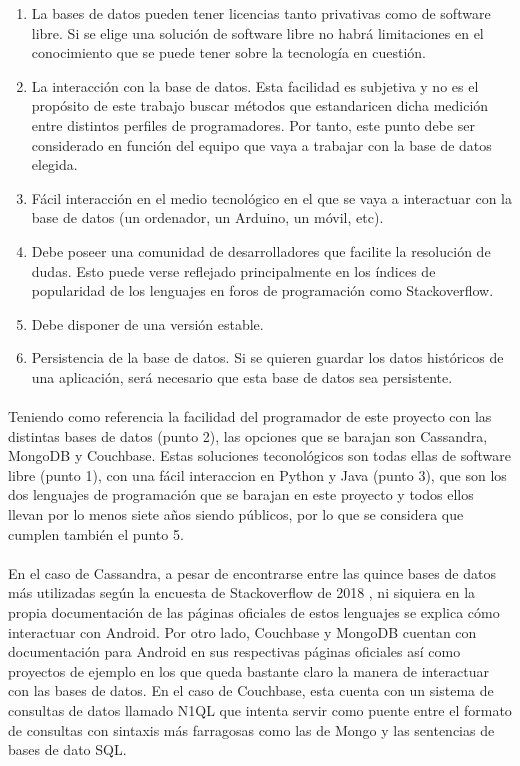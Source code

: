 \begin{itemize}
\begin{enumerate}
\item La bases de datos pueden tener licencias tanto privativas como de software libre. Si se elige una solución de software libre no habrá limitaciones en el conocimiento que se puede tener sobre la tecnología en cuestión.
\item La interacción con la base de datos. Esta facilidad es subjetiva y no es el propósito de este trabajo buscar métodos que estandaricen dicha medición entre distintos perfiles de programadores. Por tanto, este punto debe ser considerado en función del equipo que vaya a trabajar con la base de datos elegida.
\item Fácil interacción en el medio tecnológico en el que se vaya a interactuar con la base de datos (un ordenador, un Arduino, un móvil, etc).
\item Debe poseer una comunidad de desarrolladores que facilite la resolución de dudas. Esto puede verse reflejado principalmente en los índices de popularidad de los lenguajes en foros de programación como Stackoverflow.
\item Debe disponer de una versión estable.
\item Persistencia de la base de datos. Si se quieren guardar los datos históricos de una aplicación, será necesario que esta base de datos sea persistente.
\end{enumerate}

\paragraph{}
Teniendo como referencia la facilidad del programador de este proyecto con las distintas bases de datos (punto 2), las opciones que se barajan son Cassandra, MongoDB y Couchbase. Estas soluciones teconológicos son todas ellas de software libre (punto 1), con una fácil interaccion en Python y Java (punto 3), que son los dos lenguajes de programación que se barajan en este proyecto y todos ellos llevan por lo menos siete años siendo públicos, por lo que se considera que cumplen también el punto 5.

\paragraph{}
En el caso de Cassandra, a pesar de encontrarse entre las quince bases de datos más utilizadas según la encuesta de Stackoverflow de 2018 \citep{so-db}, ni siquiera en la propia documentación de las páginas oficiales de estos lenguajes se explica cómo interactuar con Android. Por otro lado, Couchbase y MongoDB  cuentan con documentación para Android en sus respectivas páginas oficiales así como proyectos de ejemplo en los que queda bastante claro la manera de interactuar con las bases de datos. En el caso de Couchbase, esta cuenta con un sistema de consultas de datos llamado N1QL que intenta servir como puente entre el formato de consultas con sintaxis más farragosas como las de Mongo y las sentencias de bases de dato SQL.


\end{itemize}
